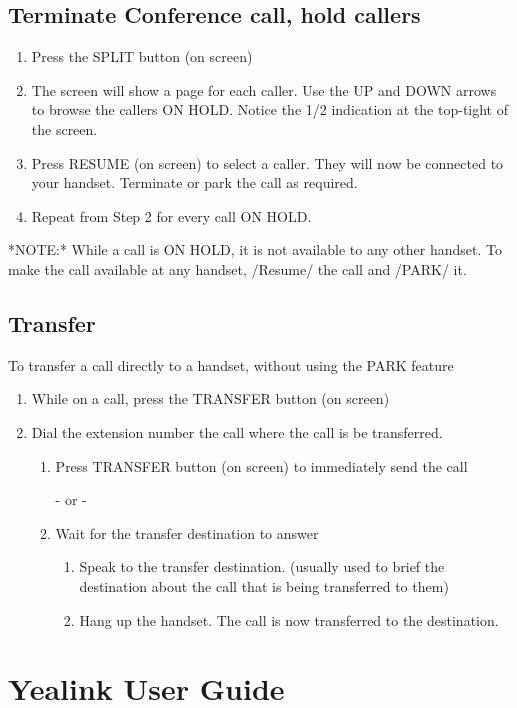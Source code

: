 \subsection{Terminate Conference call, hold callers}
\begin{enumerate}
	\item Press the SPLIT button (on screen)
	\item The screen will show a page for each caller. Use the UP and DOWN arrows to
		browse the callers ON HOLD. Notice the 1/2 indication at the top-tight of the
		screen.
	\item Press RESUME (on screen) to select a caller. They will now be connected to your
		handset. Terminate or park the call as required.
	\item Repeat from Step 2 for every call ON HOLD.
\end{enumerate}

*NOTE:* While a call is ON HOLD, it is not available to any other handset. To make the call available at
any handset, /Resume/ the call and /PARK/ it.

\subsection{Transfer}
To transfer a call directly to a handset, without using the PARK feature
\begin{enumerate}
	\item While on a call, press the TRANSFER button (on screen)
	\item Dial the extension number the call where the call is be transferred.
	\begin{enumerate}
		\item Press TRANSFER button (on screen) to immediately send the call

		- or -

		\item Wait for the transfer destination to answer
		\begin{enumerate}
			\item Speak to the transfer destination. (usually used to brief the
				destination about the call that is being transferred to them)
			\item Hang up the handset. The call is now transferred to the destination.
		\end{enumerate}
	\end{enumerate}
\end{enumerate}

\section{Yealink User Guide}
%

